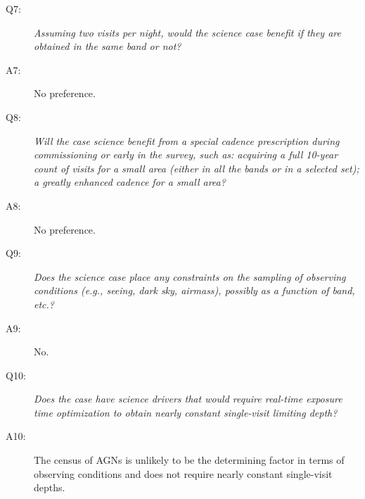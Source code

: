 \begin{description}
\item[Q7:] {\it Assuming two visits per night, would the science case
benefit if they are obtained in the same band or not?}

\item[A7:] No preference.

\item[Q8:] {\it Will the case science benefit from a special cadence
prescription during commissioning or early in the survey, such as:
acquiring a full 10-year count of visits for a small area (either in all
the bands or in a  selected set); a greatly enhanced cadence for a small
area?}

\item[A8:] No preference.

\item[Q9:] {\it Does the science case place any constraints on the
sampling of observing conditions (e.g., seeing, dark sky, airmass),
possibly as a function of band, etc.?}

\item[A9:] No.

\item[Q10:] {\it Does the case have science drivers that would require
real-time exposure time optimization to obtain nearly constant
single-visit limiting depth?}

\item[A10:] The census of AGNs is unlikely to be the determining factor
in terms of observing conditions and does not require nearly constant
single-visit depths.

\end{description}


\navigationbar
